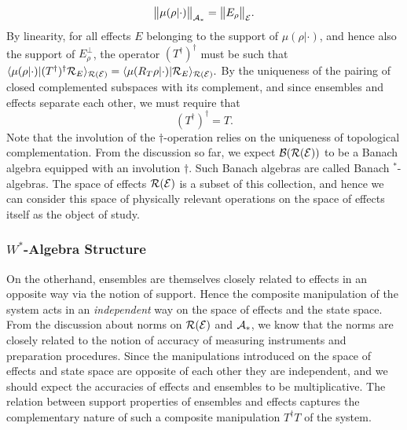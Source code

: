\documentclass[11pt]{article}
\begin{document}
$$\big\|\mu(\rho|\cdot)\big\|_{\mathcal{A}_* }=\big\| E_\rho\big\|_{\mathcal{E}}.$$
By linearity, for all effects $E$ belonging to the support of $\mu(\rho|\cdot)$, and hence also the support of $E_\rho^\perp$, the operator $(T^\dagger)^\dagger$ must be such that $\langle \mu(\rho|\cdot)|(T^{\dagger})^\dagger \mathcal{R}_E\rangle_{\mathcal{R}(\mathcal{E})}=\langle \mu(R_T\rho|\cdot)|\mathcal{R}_E\rangle_{\mathcal{R}(\mathcal{E})}.$ By the uniqueness of the pairing of closed complemented subspaces with its complement, and since ensembles and effects separate each other, we must require that
$$(T^\dagger)^\dagger=T.$$
Note that the involution of the $\dagger$-operation relies on the uniqueness of topological complementation. From the discussion so far, we expect $\mathcal{B}(\mathcal{R}(\mathcal{E}))$ to be a Banach algebra equipped with an involution $\dagger$. Such Banach algebras are called Banach $^*$-algebras. The space of effects $\mathcal{R}(\mathcal{E})$ is a subset of this collection, and hence we can consider this space of physically relevant operations on the space of effects itself as the object of study.
\subsubsection*{$W^*$-Algebra Structure}
On the otherhand, ensembles are themselves closely related to effects in an opposite way via the notion of support. Hence the composite manipulation of the system acts in an \emph{independent} way on the space of effects and the state space. From the discussion about norms on $\mathcal{R}(\mathcal{E})$ and $\mathcal{A}_* $, we know that the norms are closely related to the notion of accuracy of measuring instruments and preparation procedures. Since the manipulations introduced on the space of effects and state space are opposite of each other they are independent, and we should expect the accuracies of effects and ensembles to be multiplicative. The relation between support properties of ensembles and effects captures the complementary nature of such a composite manipulation $T^\dagger T$ of the system.
\end{document}
